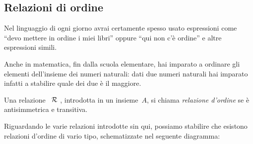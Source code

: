 \begin{comment}
\begin{definizione}
Si chiama \emph{insieme quoziente} di un insieme~\(A\) rispetto a una relazione 
di 
equivalenza~\(\srel\),
l'insieme i cui elementi sono le classi d'equivalenza determinate dalla 
relazione~\(\srel\). L'insieme quoziente si indica con il simbolo~\(A/\srel\).
\end{definizione}

Nel caso dell'esempio precedente si passa all'insieme quoziente~\(B/\srel\) del 
seguente diagramma di Eulero-Venn:
\begin{center}
 
\end{center}


\osservazione Ogni volta che si ha una relazione d'equivalenza~\(\srel\) in un 
insieme~\(A\), possiamo stabilire la seguente
catena di passaggi:
 \[\text{insieme }A\rightarrow\text{ partizione }P(A)\rightarrow\text{ insieme 
quoziente }A/\srel.\]

\ref{ese:B.39}, 


\end{comment}

\subsection{Relazioni di ordine}
\label{subsec:rel_ordine}

Nel linguaggio di ogni giorno avrai certamente spesso usato espressioni come 
``devo mettere in ordine i miei
libri'' oppure ``qui non c'è ordine'' e altre espressioni simili.

Anche in matematica, fin dalla scuola elementare, hai imparato a ordinare gli 
elementi dell'insieme dei
numeri naturali: dati due numeri naturali hai imparato infatti a stabilire 
quale 
dei due è il maggiore.

\begin{definizione}
Una relazione~\(~\mathcal{R}~\), introdotta in un insieme~\(A\), si chiama 
\emph{relazione 
d'ordine} se è antisimmetrica e transitiva.
\end{definizione}

Riguardando le varie relazioni introdotte sin qui, possiamo stabilire che 
esistono relazioni d'ordine di vario tipo, schematizzate nel seguente diagramma:
\begin{center}
 
\end{center}

